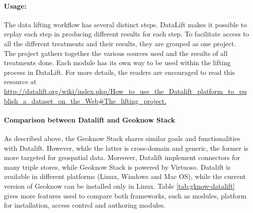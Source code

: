 \paragraph{Usage:}
The data lifting workflow has several distinct steps. DataLift makes it possible to replay each step in producing different results for each step. To facilitate access to all the different treatments and their results, they are grouped as one project. The project gathers together the various sources used and the results of all treatments done.
Each module has its own way to be used within the lifting process in DataLift. For more details, the readers are encouraged to read this resource at \\\url{http://datalift.org/wiki/index.php/How_to_use_the_Datalift_platform_to_publish_a_dataset_on_the_Web#The_lifting_project.
}



\paragraph{Comparison between Datalift and Geoknow Stack }
As described above, the Geoknow Stack shares similar goals and functionalities with Datalift. However, while the latter is cross-domain and generic, the former is more targeted for geospatial data. Moreover, Datalift implement connectors for many triple stores, while Geoknow Stack is powered by Virtuoso. Datalift is available in different platforms (Linux, Windows and Mac OS), while the current version of Geoknow can be installed only in Linux. Table \ref{tab:gknow-datalift} gives more features used to compare both frameworks, such as modules, platform for installation, access control and authoring modules.

